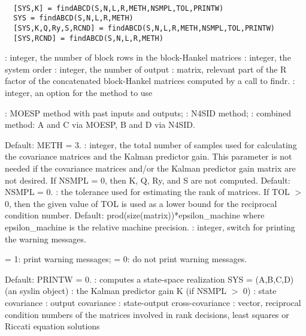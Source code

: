 \begin{mandesc}
   \\ %
\end{mandesc}
\begin{calling_sequence}
\begin{verbatim}
  [SYS,K] = findABCD(S,N,L,R,METH,NSMPL,TOL,PRINTW)   
  SYS = findABCD(S,N,L,R,METH)   
  [SYS,K,Q,Ry,S,RCND] = findABCD(S,N,L,R,METH,NSMPL,TOL,PRINTW)   
  [SYS,RCND] = findABCD(S,N,L,R,METH)   
\end{verbatim}
\end{calling_sequence}
\begin{parameters}
  \begin{varlist}
    : integer, the number of block rows in the block-Hankel matrices
    : integer, the system order
    : integer, the number of output
    : matrix, relevant part of the  R factor of the concatenated block-Hankel matrices computed by a call to findr.
    : integer, an option for the method to use
    \begin{varlist}
      :  MOESP method with past inputs and outputs;
      :  N4SID method;
      :  combined method: A and C via MOESP, B and D via N4SID.
    \end{varlist}
    Default:    METH = 3.
    : integer, the total number of samples used for calculating the covariance matrices and the Kalman predictor gain. This parameter is not needed if the covariance matrices and/or the Kalman predictor gain matrix are not desired. If NSMPL = 0, then K, Q, Ry, and S are not computed. Default:    NSMPL = 0.
    : the tolerance used for estimating the rank of matrices.  If  TOL $>$ 0,  then the given value of  TOL  is used as a lower bound for the reciprocal condition number. Default: prod(size(matrix))*epsilon\_machine where epsilon\_machine is the relative machine precision.
    : integer, switch for printing the warning messages.
    \begin{varlist}
       = 1: print warning messages;
       = 0: do not print warning messages.
    \end{varlist}
    Default:    PRINTW = 0.
    : computes a state-space realization SYS = (A,B,C,D) (an syslin object)
    : the Kalman predictor gain K (if NSMPL $>$ 0)
    :  state covariance
    : output covariance
    : state-output cross-covariance
    : vector, reciprocal condition numbers of the matrices involved in rank decisions, least squares or Riccati equation solutions
  \end{varlist}
\end{parameters}
